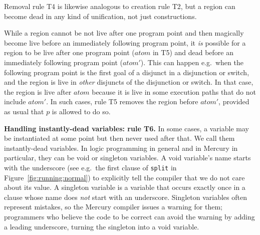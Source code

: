 \documentclass{tlp}
\newcommand{\code}[1]{{\tt#1}}
\begin{document}
Removal rule T4 is likewise analogous to creation rule T2,
but a region can become dead in any kind of unification,
not just constructions.

While a region cannot be not live after one program point
and then magically become live before an immediately following program point,
it \emph{is} possible for a region
to be live after one program point (${atom}$ in T5)
and dead before an immediately following program point (${atom'}$).
This can happen e.g.\ when the following program point
is the first goal of a disjunct in a disjunction or switch,
and the region is live in \emph{other} disjuncts of the disjunction or switch.
In that case, the region is live after ${atom}$
because it is live in some execution paths that do not include ${atom'}$.
In such cases, rule T5 removes the region before ${atom'}$,
provided as usual that $p$ is allowed to do so.

\noindent\textbf{Handling instantly-dead variables: rule T6.}
In some cases,
a variable may be instantiated at some point but then never used after that.
We call them instantly-dead variables.
In logic programming in general and in Mercury in particular,
they can be void or singleton variables.
A void variable's name starts with the underscore
(see e.g.\ the first clause of \code{split} in Figure~\ref{fig:running:normal})
to explicitly tell the compiler that we do not care about its value.
A singleton variable
is a variable that occurs exactly once in a clause
whose name does \emph{not} start with an underscore.
Singleton variables often represent mistakes,
so the Mercury compiler issues a warning for them;
programmers who believe the code to be correct
can avoid the warning by adding a leading underscore,
turning the singleton into a void variable.
\end{document}
